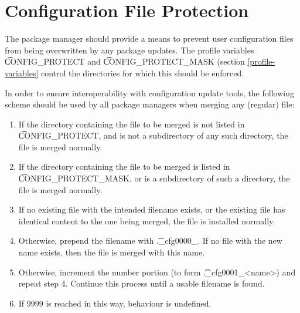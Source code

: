 \chapter{Configuration File Protection}
\label{config-protect}

The package manager should provide a means to prevent user configuration files from being
overwritten by any package updates. The profile variables \t{CONFIG\_PROTECT} and
\t{CONFIG\_PROTECT\_MASK} (section \ref{profile-variables} control the directories for which this
should be enforced.

In order to ensure interoperability with configuration update tools, the following scheme should be
used by all package managers when merging any (regular) file:

\begin{enumerate}
\item If the directory containing the file to be merged is not listed in \t{CONFIG\_PROTECT}, and is
    not a subdirectory of any such directory, the file is merged normally.
\item If the directory containing the file to be merged is listed in \t{CONFIG\_PROTECT\_MASK}, or
    is a subdirectory of such a directory, the file is merged normally.
\item If no existing file with the intended filename exists, or the existing file has identical
    content to the one being merged, the file is installed normally.
\item Otherwise, prepend the filename with \t{.\_cfg0000\_}. If no file with the new name exists,
    then the file is merged with this name.
\item Otherwise, increment the number portion (to form \t{.\_cfg0001\_<name>}) and repeat step 4.
    Continue this process until a usable filename is found.
\item If 9999 is reached in this way, behaviour is undefined.
\end{enumerate}

